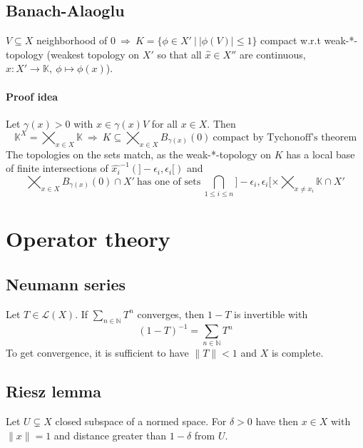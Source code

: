 \documentclass{scrartcl}
\newcommand{\N}{\mathbb{N}}
\begin{document}
\subsection{Banach-Alaoglu}
$V \subseteq X$ neighborhood of $0 \ \Rightarrow \ K = \{ \phi \in X' \ | \ |\phi(V)| \leq 1 \}$ compact w.r.t weak-*-topology (weakest topology on $X'$ so that all $\hat{x} \in X''$ are continuous, $\hat{x}: X' \to \mathbb{K}, \ \phi \mapsto \phi(x)$).
\paragraph{Proof idea} Let $\gamma(x) > 0$ with $x \in \gamma(x)V$ for all $x \in X$. Then
\begin{equation}
    \mathbb{K}^X = \bigtimes_{x \in X} \mathbb{K} \ \Rightarrow \ K \subseteq \bigtimes_{x \in X} B_{\gamma(x)}(0) \ \text{compact by Tychonoff's theorem}\nonumber
\end{equation}
The topologies on the sets match, as the weak-*-topology on $K$ has a local base of finite intersections of $\hat{x_i}^{-1}(]-\epsilon_i, \epsilon_i[)$ and 
\begin{equation}
    \bigtimes_{x \in X} B_{\gamma(x)}(0) \cap X' \ \text{has one of sets} \ \bigcap_{1 \leq i \leq n} ]-\epsilon_i, \epsilon_i[ \times \bigtimes_{x \neq x_i} \mathbb{K} \cap X' \nonumber
\end{equation}

\section{Operator theory}

\subsection{Neumann series}
Let $T \in \mathcal{L}(X)$. If $\sum_{n \in \N} T^n$ converges, then $1 - T$ is invertible with
\begin{equation*}
    (1 - T)^{-1} = \sum_{n \in \N} T^n
\end{equation*}
To get convergence, it is sufficient to have $\|T\| < 1$ and $X$ is complete.

\subsection{Riesz lemma}
\label{riesz_lemma}
Let $U \subsetneq X$ closed subspace of a normed space. For $\delta > 0$ have then $x \in X$ with $\|x\|=1$ and distance greater than $1 - \delta$ from $U$.
\end{document}
